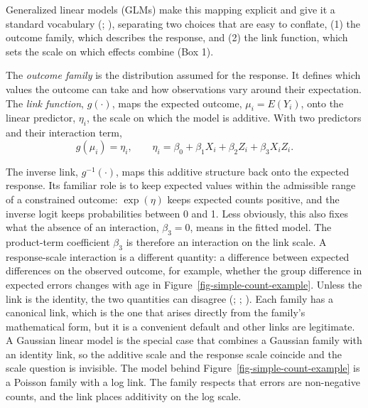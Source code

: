 \documentclass[
  man,
  floatsintext,
  longtable,
  nolmodern,
  notxfonts,
  notimes,
  colorlinks=true,linkcolor=blue,citecolor=blue,urlcolor=blue]{apa7}
\begin{document}
Generalized linear models (GLMs) make this mapping explicit and give it
a standard vocabulary (; ), separating two choices that are easy to conflate, (1) the
outcome family, which describes the response, and (2) the link function,
which sets the scale on which effects combine (Box 1).

\begin{tcolorbox}[enhanced jigsaw, arc=.35mm, bottomrule=.15mm, bottomtitle=1mm, breakable, colback=white, colbacktitle=quarto-callout-note-color!10!white, colframe=quarto-callout-note-color-frame, coltitle=black, left=2mm, leftrule=.75mm, opacityback=0, opacitybacktitle=0.6, rightrule=.15mm, title={Box 1: Generalized linear models: outcome family and link function}, titlerule=0mm, toprule=.15mm, toptitle=1mm]

The \emph{outcome family} is the distribution assumed for the response.
It defines which values the outcome can take and how observations vary
around their expectation. The \emph{link function}, \(g(\cdot)\), maps
the expected outcome, \(\mu_i = E(Y_i)\), onto the linear predictor,
\(\eta_i\), the scale on which the model is additive. With two
predictors and their interaction term,
\[g(\mu_i) = \eta_i, \qquad \eta_i = \beta_0 + \beta_1 X_i + \beta_2 Z_i + \beta_3 X_i Z_i.\]

The inverse link, \(g^{-1}(\cdot)\), maps this additive structure back
onto the expected response. Its familiar role is to keep expected values
within the admissible range of a constrained outcome: \(\exp(\eta)\)
keeps expected counts positive, and the inverse logit keeps
probabilities between 0 and 1. Less obviously, this also fixes what the
absence of an interaction, \(\beta_3 = 0\), means in the fitted model.
The product-term coefficient \(\beta_3\) is therefore an interaction on
the link scale. A response-scale interaction is a different quantity: a
difference between expected differences on the observed outcome, for
example, whether the group difference in expected errors changes with
age in Figure~\ref{fig-simple-count-example}. Unless the link is the
identity, the two quantities can disagree
(;
;
). Each family has a canonical link,
which is the one that arises directly from the family's mathematical
form, but it is a convenient default and other links are legitimate. A
Gaussian linear model is the special case that combines a Gaussian
family with an identity link, so the additive scale and the response
scale coincide and the scale question is invisible. The model behind
Figure~\ref{fig-simple-count-example} is a Poisson family with a log
link. The family respects that errors are non-negative counts, and the
link places additivity on the log scale.

\end{tcolorbox}
\end{document}

